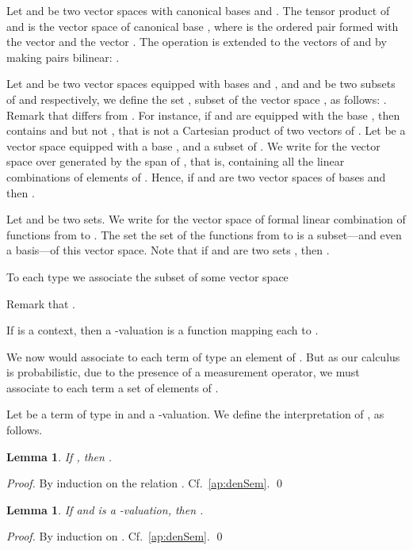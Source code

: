 \documentclass[preprint]{elsarticle}
\newtheorem{lemma}[theorem]{Lemma}
\begin{document}
Let  and  be two vector spaces with canonical bases  and . The tensor product  of
 and  is the vector space of canonical base , where 
is the ordered pair formed with the vector  and the vector
.
The operation  is extended to the vectors of  and  by making
pairs bilinear:
.

Let  and  be two vector spaces equipped with bases  and , and 
and  be two subsets of  and  respectively, we define the set , subset of the vector space , as follows: .
Remark that  differs from . For instance, if  and
 are  equipped with the base , then  contains  and  but not
, that is not a Cartesian product of
two vectors of .
Let  be a vector space equipped with a base , and  a subset of . We
write  for the vector space over  generated by the span of
, that is, containing all the linear combinations of elements of .
Hence, if  and  are two vector spaces of bases  and  then .

Let  and  be two sets. We write  for the vector space of formal
linear combination of functions from  to . The set
 the set of
the functions from  to  is a subset---and even a basis---of this vector
space.
Note that if  and  are two sets , then .

To each type we associate the subset of some vector space

Remark that
.

If  is a context, then a -valuation
is a function mapping each  to .

We now would associate to each term  of type  an element  of . But as our calculus is probabilistic, due to the presence of a measurement
operator, we must associate to each term a set of elements of .


Let  be a term of type  in  and  a -valuation. We
define the interpretation of ,  as follows.



\begin{lemma}
  \label{lem:inc}
  If , then .
\end{lemma}
\begin{proof}
  By induction on the relation . Cf.~\ref{ap:denSem}. \qed
\end{proof}

\begin{lemma}
  \label{lem:subsDen}
  If  and  is a
  -valuation, then .
\end{lemma}
\begin{proof}
  By induction on . Cf.~\ref{ap:denSem}. \qed
\end{proof}
\end{document}
